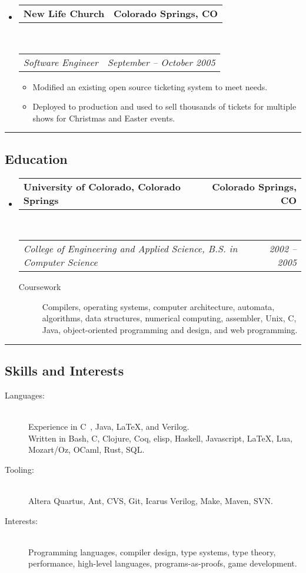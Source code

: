\documentclass[10pt,letterpaper]{article}
\makeatletter
\newenvironment{indentsection}[1]%
{\begin{list}{}%
	{\setlength{\leftmargin}{#1}}%
	\item[]%
}
{\end{list}}
\newcommand{\headerrow}[2]
{\begin{tabular*}{\linewidth}{l@{\extracolsep{\fill}}r}
	#1 &
	#2 \\
\end{tabular*}}
\newcommand{\CPP}
{C\nolinebreak[4]\hspace{-.05em}\raisebox{.22ex}{\footnotesize\bf ++}}
\makeatother
\begin{document}
\begin{itemize}
	\item
	\headerrow
		{\textbf{New Life Church}}
		{\textbf{Colorado Springs, CO}}
	\\
	\headerrow
		{\emph{Software Engineer}}
		{\emph{September -- October 2005}}
	\begin{itemize}
		\item Modified an existing open source ticketing system to meet needs.
		\item Deployed to production and used to sell thousands of tickets for multiple shows for Christmas and Easter events.
	\end{itemize}

\end{itemize}


\hrule
\vspace{-0.4em}
\subsection*{Education}

\begin{itemize}
	\parskip=0.1em

	\item
	\headerrow
		{\textbf{University of Colorado, Colorado Springs}}
		{\textbf{Colorado Springs, CO}}
	\\
	\headerrow
		{\emph{College of Engineering and Applied Science, B.S. in Computer Science}}
		{\emph{2002 -- 2005}}
	\begin{description}
		\item[Coursework] Compilers, operating systems, computer architecture, automata, algorithms, data structures, numerical computing, assembler, Unix, C, Java, object-oriented programming and design, and web programming.
	\end{description}

\end{itemize}


\hrule
\vspace{-0.4em}
\subsection*{Skills and Interests}

\begin{indentsection}{\parindent}
\begin{description}
	\item[Languages:] \ \\
	Experience in \CPP \ , Java, \LaTeX, and Verilog. \\
	Written in Bash, C, Clojure, Coq, elisp, Haskell, Javascript, \LaTeX, Lua, Mozart/Oz, OCaml, Rust, SQL.
	\item[Tooling:] \ \\
	Altera Quartus, Ant, CVS, Git, Icarus Verilog, Make, Maven, SVN.
	\item[Interests:] \ \\
	Programming languages, compiler design, type systems, type theory, performance, high-level languages, programs-as-proofs, game development.
\end{description}
\end{indentsection}
\end{document}
